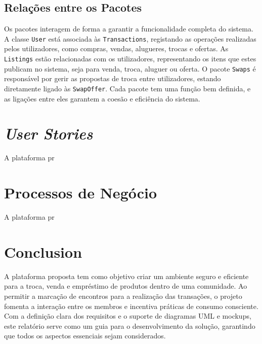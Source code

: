 \documentclass[a4paper, 12pt]{article} %
\begin{document}
\subsection{Relações entre os Pacotes}

Os pacotes interagem de forma a garantir a funcionalidade completa do sistema. A classe \texttt{User} está associada às \texttt{Transactions}, registando as operações realizadas pelos utilizadores, como compras, vendas, alugueres, trocas e ofertas. As \texttt{Listings} estão relacionadas com os utilizadores, representando os itens que estes publicam no sistema, seja para venda, troca, aluguer ou oferta. O pacote \texttt{Swaps} é responsável por gerir as propostas de troca entre utilizadores, estando diretamente ligado às \texttt{SwapOffer}. Cada pacote tem uma função bem definida, e as ligações entre eles garantem a coesão e eficiência do sistema.

\newpage
\section*{\textit{User Stories}}

A plataforma pr

\newpage
\section*{Processos de Negócio}

A plataforma pr



\newpage
\section*{Conclusion}

A plataforma proposta tem como objetivo criar um ambiente seguro e eficiente para a troca, venda e empréstimo de produtos dentro de uma comunidade. Ao permitir a marcação de encontros para a realização das transações, o projeto fomenta a interação entre os membros e incentiva práticas de consumo consciente. 
Com a definição clara dos requisitos e o suporte de diagramas UML e mockups, este relatório serve como um guia para o desenvolvimento da solução, garantindo que todos os aspectos essenciais sejam considerados.







\end{document}
